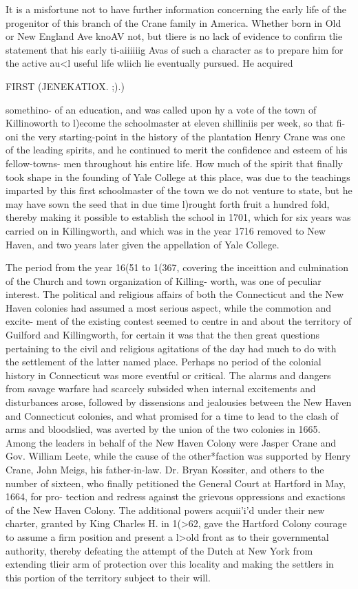 It is a misfortune not to have further information concerning 
the early life of the progenitor of this branch of the Crane family 
in America. Whether born in Old or New England Ave knoAV not, 
but tliere is no lack of evidence to confirm tlie statement that his 
early ti-aiiiiiig Avas of such a character as to prepare him for the 
active au<l useful life wliich lie eventually pursued. He acquired 



FIRST (JENEKATIOX. ;).) 

somethino- of an education, and was called upon hy a vote of the 
town of Killinoworth to l)ecome the schoolmaster at eleven shilliniis 
per week, so that fi-oni the very starting-point in the history of 
the plantation Henry Crane was one of the leading spirits, and he 
continued to merit the confidence and esteem of his fellow-towns- 
men throughout his entire life. How much of the spirit that 
finally took shape in the founding of Yale College at this place, 
was due to the teachings imparted by this first schoolmaster of 
the town we do not venture to state, but he may have sown the 
seed that in due time l)rought forth fruit a hundred fold, thereby 
making it possible to establish the school in 1701, which for six 
years was carried on in Killingworth, and which was in the year 
1716 removed to New Haven, and two years later given the 
appellation of Yale College. 

The period from the year 16(51 to 1(367, covering the inceittion 
and culmination of the Church and town organization of Killing- 
worth, was one of peculiar interest. The political and religious 
affairs of both the Connecticut and the New Haven colonies had 
assumed a most serious aspect, while the commotion and excite- 
ment of the existing contest seemed to centre in and about the 
territory of Guilford and Killingworth, for certain it was that the 
then great questions pertaining to the civil and religious agitations 
of the day had much to do with the settlement of the latter named 
place. Perhaps no period of the colonial history in Connecticut 
was more eventful or critical. The alarms and dangers from 
savage warfare had scarcely subsided when internal excitements 
and disturbances arose, followed by dissensions and jealousies 
between the New Haven and Connecticut colonies, and what 
promised for a time to lead to the clash of arms and bloodslied, 
was averted by the union of the two colonies in 1665. Among 
the leaders in behalf of the New Haven Colony were Jasper Crane 
and Gov. William Leete, while the cause of the other*faction was 
supported by Henry Crane, John Meigs, his father-in-law. Dr. 
Bryan Kossiter, and others to the number of sixteen, who finally 
petitioned the General Court at Hartford in May, 1664, for pro- 
tection and redress against the grievous oppressions and exactions 
of the New Haven Colony. The additional powers acquii'i'd 
under their new charter, granted by King Charles H. in 1(>62, 
gave the Hartford Colony courage to assume a firm position and 
present a l>old front as to their governmental authority, thereby 
defeating the attempt of the Dutch at New York from extending 
tlieir arm of protection over this locality and making the settlers 
in this portion of the territory subject to their will. 

